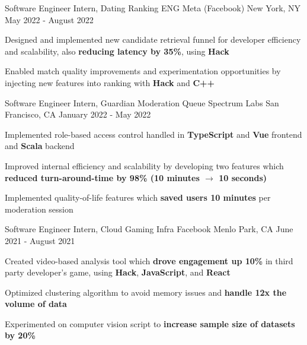 

\begin{cventries}
  \cventry
    {Software Engineer Intern, Dating Ranking ENG} %
    {Meta (Facebook)} %
    {New York, NY} %
    {May 2022 - August 2022} %
    {
      \begin{cvitems} %
        \item {Designed and implemented new candidate retrieval funnel for developer efficiency and scalability, also \textbf{reducing latency by 35\%}, using \textbf{Hack}}
        \item {Enabled match quality improvements and experimentation opportunities by injecting new features into ranking with \textbf{Hack} and \textbf{C++}}
      \end{cvitems}
    }

  \cventry
    {Software Engineer Intern, Guardian Moderation Queue} %
    {Spectrum Labs} %
    {San Francisco, CA} %
    {January 2022 - May 2022} %
    {
      \begin{cvitems} %
        \item {Implemented role-based access control handled in \textbf{TypeScript} and \textbf{Vue} frontend and \textbf{Scala} backend}
        \item {Improved internal efficiency and scalability by developing two features which \textbf{reduced turn-around-time by 98\% (10 minutes $\rightarrow$ 10 seconds)}}
        \item {Implemented quality-of-life features which \textbf{saved users 10 minutes} per moderation session}
      \end{cvitems}
    }

  \cventry
    {Software Engineer Intern, Cloud Gaming Infra} %
    {Facebook} %
    {Menlo Park, CA} %
    {June 2021 - August 2021} %
    {
      \begin{cvitems} %
        \item {Created video-based analysis tool which \textbf{drove engagement up 10\%} in third party developer's game, using \textbf{Hack}, \textbf{JavaScript}, and \textbf{React}}
        \item {Optimized clustering algorithm to avoid memory issues and \textbf{handle 12x the volume of data}}
        \item {Experimented on computer vision script to \textbf{increase sample size of datasets by 20\%}}
      \end{cvitems}
    }


\end{cventries}
